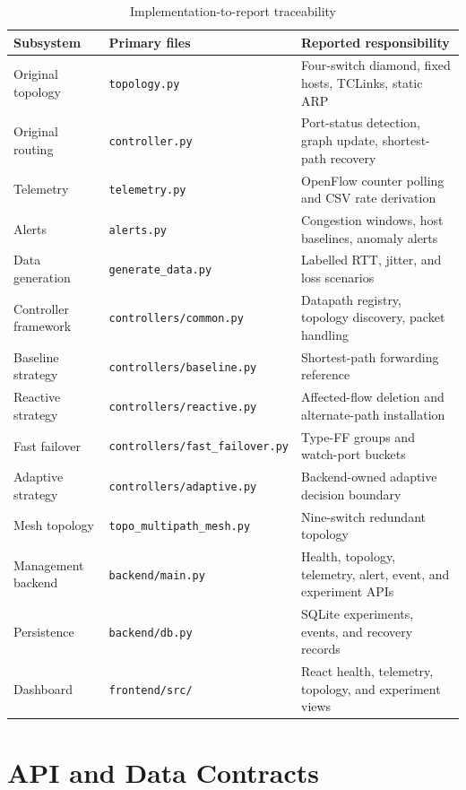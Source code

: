 \documentclass[conference]{IEEEtran}
\begin{document}
\begin{table}[t]
\centering
\caption{Implementation-to-report traceability}
\label{tab:files}
\begin{tabular}{p{}p{}p{}}
\toprule
Subsystem & Primary files & Reported responsibility\\
\midrule
Original topology & \texttt{topology.py} & Four-switch diamond, fixed hosts, TCLinks, static ARP\\
Original routing & \texttt{controller.py} & Port-status detection, graph update, shortest-path recovery\\
Telemetry & \texttt{telemetry.py} & OpenFlow counter polling and CSV rate derivation\\
Alerts & \texttt{alerts.py} & Congestion windows, host baselines, anomaly alerts\\
Data generation & \texttt{generate\_data.py} & Labelled RTT, jitter, and loss scenarios\\
Controller framework & \texttt{controllers/common.py} & Datapath registry, topology discovery, packet handling\\
Baseline strategy & \texttt{controllers/baseline.py} & Shortest-path forwarding reference\\
Reactive strategy & \texttt{controllers/reactive.py} & Affected-flow deletion and alternate-path installation\\
Fast failover & \texttt{controllers/fast\_failover.py} & Type-FF groups and watch-port buckets\\
Adaptive strategy & \texttt{controllers/adaptive.py} & Backend-owned adaptive decision boundary\\
Mesh topology & \texttt{topo\_multipath\_mesh.py} & Nine-switch redundant topology\\
Management backend & \texttt{backend/main.py} & Health, topology, telemetry, alert, event, and experiment APIs\\
Persistence & \texttt{backend/db.py} & SQLite experiments, events, and recovery records\\
Dashboard & \texttt{frontend/src/} & React health, telemetry, topology, and experiment views\\
\bottomrule
\end{tabular}
\end{table}

\section{API and Data Contracts}
\label{app:api}
\end{document}
